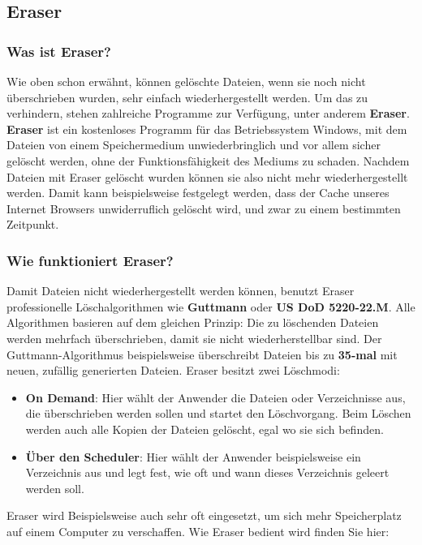 \documentclass[10pt,a4paper]{article} %
\begin{document}
\pagebreak
\subsection{Eraser}
\subsubsection{Was ist Eraser?}
Wie oben schon erwähnt, können gelöschte Dateien, wenn sie noch nicht überschrieben wurden, sehr einfach wiederhergestellt werden. Um das zu verhindern, stehen zahlreiche Programme zur Verfügung, unter anderem \textbf{Eraser}. \newline \newline
\textbf{Eraser} ist ein kostenloses Programm für das Betriebssystem Windows, mit dem Dateien von einem Speichermedium unwiederbringlich und vor allem sicher gelöscht werden, ohne der Funktionsfähigkeit des Mediums zu schaden. Nachdem Dateien mit Eraser gelöscht wurden können sie also nicht mehr wiederhergestellt werden. Damit kann beispielsweise festgelegt werden, dass der Cache unseres Internet Browsers unwiderruflich gelöscht wird, und zwar zu einem bestimmten Zeitpunkt.
\newline \newline
\subsubsection{Wie funktioniert Eraser?}
Damit Dateien nicht wiederhergestellt werden können, benutzt Eraser professionelle Löschalgorithmen wie \textbf{Guttmann} oder \textbf{US DoD 5220-22.M}. Alle Algorithmen basieren auf dem gleichen Prinzip:
Die zu löschenden Dateien werden mehrfach überschrieben, damit sie nicht wiederherstellbar sind. Der Guttmann-Algorithmus beispielsweise überschreibt Dateien bis zu \textbf{35-mal} mit neuen, zufällig generierten Dateien.\newline
Eraser besitzt zwei Löschmodi:
\begin{itemize}
\item
\textbf{On Demand}: Hier wählt der Anwender die Dateien oder Verzeichnisse aus, die überschrieben werden sollen und startet den Löschvorgang. Beim Löschen werden auch alle Kopien der Dateien gelöscht, egal wo sie sich befinden.
\item
\textbf{Über den Scheduler}: Hier wählt der Anwender beispielsweise ein Verzeichnis aus und legt fest, wie oft und wann dieses Verzeichnis geleert werden soll.
\end{itemize}
Eraser wird Beispielsweise auch sehr oft eingesetzt, um sich mehr Speicherplatz auf einem Computer zu verschaffen.
\newline \newline
Wie Eraser bedient wird finden Sie hier:\cite{Eraser}
\pagebreak
\end{document}
